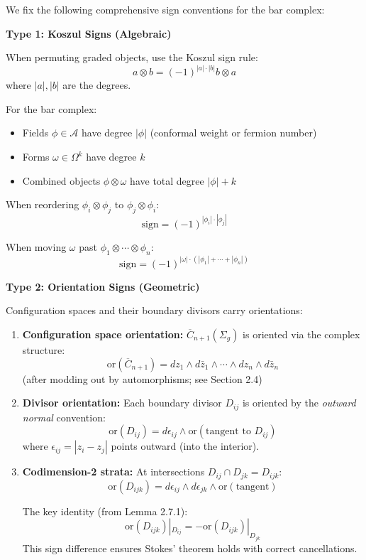 \begin{convention}\label{conv:orientations-enhanced}
We fix the following comprehensive sign conventions for the bar complex:

\textbf{Type 1: Koszul Signs (Algebraic)}

When permuting graded objects, use the Koszul sign rule:
$$a \otimes b = (-1)^{|a| \cdot |b|} b \otimes a$$
where $|a|, |b|$ are the degrees.

For the bar complex:
\begin{itemize}
\item Fields $\phi \in \mathcal{A}$ have degree $|\phi|$ (conformal weight or fermion number)
\item Forms $\omega \in \Omega^k$ have degree $k$
\item Combined objects $\phi \otimes \omega$ have total degree $|\phi| + k$
\end{itemize}

When reordering $\phi_i \otimes \phi_j$ to $\phi_j \otimes \phi_i$:
$$\text{sign} = (-1)^{|\phi_i| \cdot |\phi_j|}$$

When moving $\omega$ past $\phi_1 \otimes \cdots \otimes \phi_n$:
$$\text{sign} = (-1)^{|\omega| \cdot (|\phi_1| + \cdots + |\phi_n|)}$$

\textbf{Type 2: Orientation Signs (Geometric)}

Configuration spaces and their boundary divisors carry orientations:

\begin{enumerate}
\item \textbf{Configuration space orientation:} $\overline{C}_{n+1}(\Sigma_g)$ is oriented via the complex structure:
$$\text{or}(\overline{C}_{n+1}) = dz_1 \wedge d\bar{z}_1 \wedge \cdots \wedge dz_n \wedge d\bar{z}_n$$
(after modding out by automorphisms; see Section 2.4)

\item \textbf{Divisor orientation:} Each boundary divisor $D_{ij}$ is oriented by the \emph{outward normal} convention:
$$\text{or}(D_{ij}) = d\epsilon_{ij} \wedge \text{or}(\text{tangent to } D_{ij})$$
where $\epsilon_{ij} = |z_i - z_j|$ points outward (into the interior).

\item \textbf{Codimension-2 strata:} At intersections $D_{ij} \cap D_{jk} = D_{ijk}$:
$$\text{or}(D_{ijk}) = d\epsilon_{ij} \wedge d\epsilon_{jk} \wedge \text{or}(\text{tangent})$$

The key identity (from Lemma 2.7.1):
$$\text{or}(D_{ijk})|_{D_{ij}} = -\text{or}(D_{ijk})|_{D_{jk}}$$
This sign difference ensures Stokes' theorem holds with correct cancellations.


\end{enumerate}
\end{convention}

